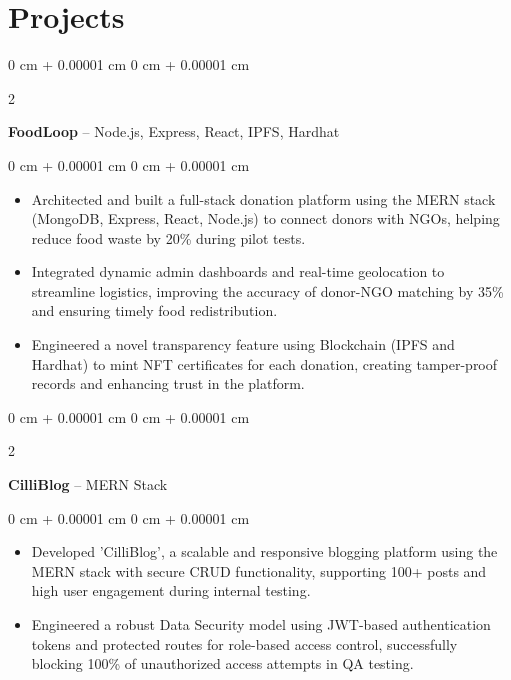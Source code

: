 \documentclass[10pt, letterpaper]{article}
\newenvironment{highlights}{
    \begin{itemize}[
        topsep=0.10 cm,
        parsep=0.10 cm,
        partopsep=0pt,
        itemsep=0pt,
        leftmargin=0 cm + 10pt
    ]
}{
    \end{itemize}
} %
\newenvironment{onecolentry}{
    \begin{adjustwidth}{
        0 cm + 0.00001 cm
    }{
        0 cm + 0.00001 cm
    }
}{
    \end{adjustwidth}
} %
\newenvironment{twocolentry}[2][]{
    \onecolentry
    \def\secondColumn{#2}
    \setcolumnwidth{\fill, 4.5 cm}
    \begin{paracol}{2}
}{
    \switchcolumn \raggedleft \secondColumn
    \end{paracol}
    \endonecolentry
} %
\begin{document}
    \section{Projects}

        \begin{twocolentry}{
            \href{https://github.com/ritheshan/FoodLoop}{\faGithub}
        }
            \textbf{FoodLoop} -- Node.js, Express, React, IPFS, Hardhat\end{twocolentry}

        \vspace{0.10 cm}
        \begin{onecolentry}
            \begin{highlights}
                \item Architected and built a full-stack donation platform using the MERN stack (MongoDB, Express, React, Node.js) to connect donors with NGOs, helping reduce food waste by 20\% during pilot tests.
                \item Integrated dynamic admin dashboards and real-time geolocation to streamline logistics, improving the accuracy of donor-NGO matching by 35\% and ensuring timely food redistribution.
                \item Engineered a novel transparency feature using Blockchain (IPFS and Hardhat) to mint NFT certificates for each donation, creating tamper-proof records and enhancing trust in the platform.
            \end{highlights}
        \end{onecolentry}

        \vspace{0.2 cm}

        \begin{twocolentry}{
            \href{https://github.com/ritheshan/blog-app}{\faGithub}
        }
            \textbf{CilliBlog} -- MERN Stack\end{twocolentry}

        \vspace{0.10 cm}
        \begin{onecolentry}
            \begin{highlights}
                \item Developed 'CilliBlog', a scalable and responsive blogging platform using the MERN stack with secure CRUD functionality, supporting 100+ posts and high user engagement during internal testing.
                \item Engineered a robust Data Security model using JWT-based authentication tokens and protected routes for role-based access control, successfully blocking 100\% of unauthorized access attempts in QA testing.
            \end{highlights}
        \end{onecolentry}
\end{document}
